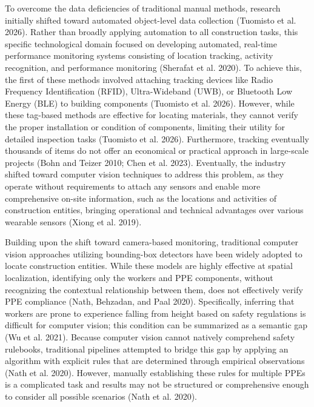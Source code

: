 \documentclass[10pt]{article}
\begin{document}
To overcome the data deficiencies of traditional manual methods, research initially shifted toward automated object-level data collection (Tuomisto et al. 2026). Rather than broadly applying automation to all construction tasks, this specific technological domain focused on developing automated, real-time performance monitoring systems consisting of location tracking, activity recognition, and performance monitoring (Sherafat et al. 2020). To achieve this, the first of these methods involved attaching tracking devices like Radio Frequency Identification (RFID), Ultra-Wideband (UWB), or Bluetooth Low Energy (BLE) to building components (Tuomisto et al. 2026). However, while these tag-based methods are effective for locating materials, they cannot verify the proper installation or condition of components, limiting their utility for detailed inspection tasks (Tuomisto et al. 2026). Furthermore, tracking eventually thousands of items do not offer an economical or practical approach in large-scale projects (Bohn and Teizer 2010; Chen et al. 2023). Eventually, the industry shifted toward computer vision techniques to address this problem, as they operate without requirements to attach any sensors and enable more comprehensive on-site information, such as the locations and activities of construction entities, bringing operational and technical advantages over various wearable sensors (Xiong et al. 2019).

Building upon the shift toward camera-based monitoring, traditional computer vision approaches utilizing bounding-box detectors have been widely adopted to locate construction entities. While these models are highly effective at spatial localization, identifying only the workers and PPE components, without recognizing the contextual relationship between them, does not effectively verify PPE compliance (Nath, Behzadan, and Paal 2020). Specifically, inferring that workers are prone to experience falling from height based on safety regulations is difficult for computer vision; this condition can be summarized as a semantic gap (Wu et al. 2021). Because computer vision cannot natively comprehend safety rulebooks, traditional pipelines attempted to bridge this gap by applying an algorithm with explicit rules that are determined through empirical observations (Nath et al. 2020). However, manually establishing these rules for multiple PPEs is a complicated task and results may not be structured or comprehensive enough to consider all possible scenarios (Nath et al. 2020).
\end{document}

